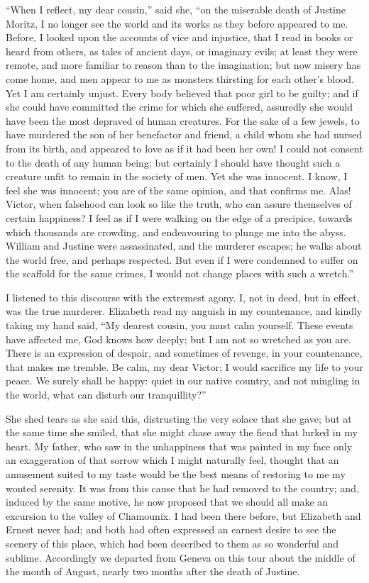 ``When I reflect, my dear cousin,''
said she, ``on the miserable death of Justine
Moritz, I no longer see the world
and its works as they before appeared
to me. Before, I looked upon the accounts
of vice and injustice, that I read
in books or heard from others, as tales
of ancient days, or imaginary evils; at
least they were remote, and more familiar
to reason than to the imagination;
but now misery has come home, and
men appear to me as monsters thirsting
for each other's blood. Yet I am
certainly unjust. Every body believed
that poor girl to be guilty; and if she
could have committed the crime for
which she suffered, assuredly she would
have been the most depraved of human
creatures. For the sake of a few jewels,
to have murdered the son of her benefactor
and friend, a child whom she had
nursed from its birth, and appeared to
love as if it had been her own! I
could not consent to the death of any
human being; but certainly I should
have thought such a creature unfit to
remain in the society of men. Yet she
was innocent. I know, I feel she was
innocent; you are of the same opinion,
and that confirms me. Alas! Victor,
when falsehood can look so like the
truth, who can assure themselves of
certain happiness? I feel as if I were
walking on the edge of a precipice, towards
which thousands are crowding,
and endeavouring to plunge me into
the abyss. William and Justine were
assassinated, and the murderer escapes;
he walks about the world free, and perhaps
respected. But even if I were
condemned to suffer on the scaffold
for the same crimes, I would not change
places with such a wretch.''

I listened to this discourse with the
extremest agony. I, not in deed, but
in effect, was the true murderer. Elizabeth
read my anguish in my countenance,
and kindly taking my hand
said, ``My dearest cousin, you must
calm yourself. These events have
affected me, God knows how deeply;
but I am not so wretched as you are.
There is an expression of despair, and
sometimes of revenge, in your countenance,
that makes me tremble. Be calm,
my dear Victor; I would sacrifice my
life to your peace. We surely shall be
happy: quiet in our native country, and
not mingling in the world, what can disturb
our tranquillity?''

She shed tears as she said this, distrusting
the very solace that she gave;
but at the same time she smiled, that
she might chase away the fiend that
lurked in my heart. My father, who
saw in the unhappiness that was painted
in my face only an exaggeration of that
sorrow which I might naturally feel,
thought that an amusement suited to
my taste would be the best means of
restoring to me my wonted serenity.
It was from this cause that he had removed
to the country; and, induced by
the same motive, he now proposed that
we should all make an excursion to
the valley of Chamounix. I had been
there before, but Elizabeth and Ernest
never had; and both had often expressed
an earnest desire to see the scenery of
this place, which had been described
to them as so wonderful and sublime.
Accordingly we departed from Geneva
on this tour about the middle of the
month of August, nearly two months
after the death of Justine.

